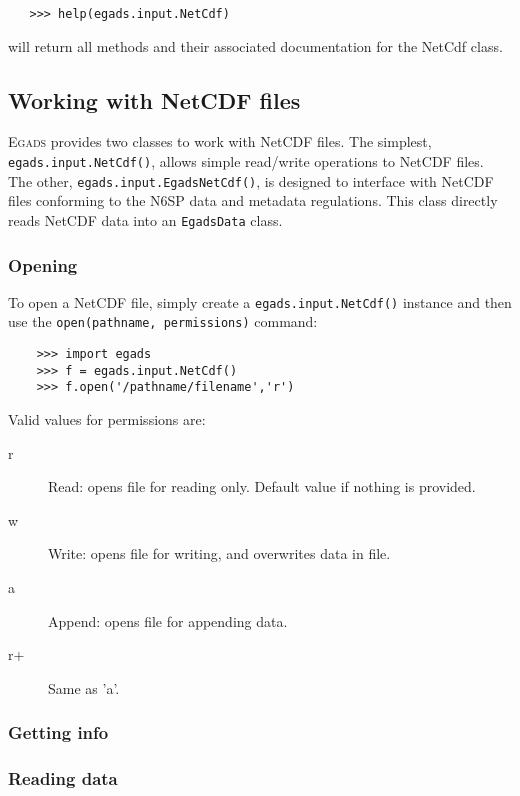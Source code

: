 \documentclass[a4paper,11pt]{report}
\newcommand{\Egads}{\textsc{Egads} }
\begin{document}
\begin{verbatim}
   >>> help(egads.input.NetCdf)
\end{verbatim}
will return all methods and their associated documentation for the NetCdf class.

\subsection{Working with NetCDF files}

\Egads provides two classes to work with NetCDF files. The simplest, \verb|egads.input.NetCdf()|, allows simple read/write operations to NetCDF files. The other, \verb|egads.input.EgadsNetCdf()|, is designed to interface with NetCDF files conforming to the N6SP data and metadata regulations. This class directly reads NetCDF data into an \verb|EgadsData| class.

\subsubsection{Opening}

To open a NetCDF file, simply create a \verb|egads.input.NetCdf()| instance and then use the \verb|open(pathname, permissions)| command:

\begin{verbatim}
    >>> import egads
    >>> f = egads.input.NetCdf()
    >>> f.open('/pathname/filename','r')
\end{verbatim}

Valid values for permissions are:

\begin{description}
 \item[r] Read: opens file for reading only. Default value if nothing is provided.
 \item[w] Write: opens file for writing, and overwrites data in file.
 \item[a] Append: opens file for appending data.
 \item[r+] Same as 'a'.
\end{description}


\subsubsection{Getting info}



\subsubsection{Reading data}
\end{document}
